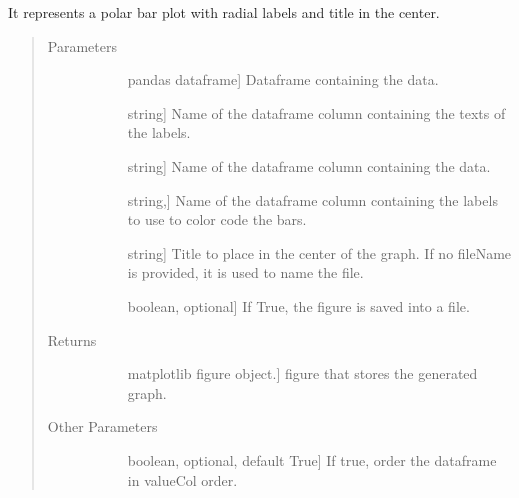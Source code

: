 \documentclass[letterpaper,10pt,english]{sphinxmanual}
\begin{document}
\begin{fulllineitems}
\label{\detokenize{rstFiles/polarPlot:polarPlot.polarBarPlot}}
It represents a polar bar plot with radial labels 
and title in the center.
\begin{quote}\begin{description}
\item[{Parameters}] \leavevmode\begin{description}
\item[{}] \leavevmode{[}pandas dataframe{]}
Dataframe containing the data.

\item[{}] \leavevmode{[}string{]}
Name of the dataframe column containing the texts of the labels.

\item[{}] \leavevmode{[}string{]}
Name of the dataframe column containing the data.

\item[{}] \leavevmode{[}string,{]}
Name of the dataframe column 
containing the labels to use to color code the bars.

\item[{}] \leavevmode{[}string{]}
Title to place in the center of the graph.
If no fileName is provided, it is used to name the file.

\item[{}] \leavevmode{[}boolean, optional{]}
If True, the figure is saved into a file.

\end{description}

\item[{Returns}] \leavevmode\begin{description}
\item[{}] \leavevmode{[}matplotlib figure object.{]}
figure that stores the generated graph.

\end{description}

\item[{Other Parameters}] \leavevmode\begin{description}
\item[{}] \leavevmode{[}boolean, optional, default True{]}
If true, order the dataframe in valueCol order.


\end{description}
\end{description}
\end{quote}
\end{fulllineitems}
\end{document}
